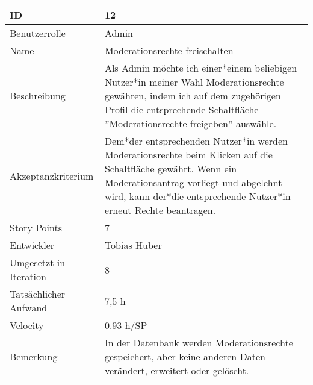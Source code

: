 \begin{tabularx}{\textwidth}{|p{}|X|}
	\hline
	ID & 12\\
	\hline
	Benutzerrolle & Admin\\
	\hline
	Name & Moderationsrechte freischalten\\
	\hline
	Beschreibung & Als Admin möchte ich einer*einem beliebigen Nutzer*in meiner Wahl Moderationsrechte gewähren, indem ich auf dem zugehörigen Profil die entsprechende Schaltfläche ''Moderationsrechte freigeben'' auswähle.\\
	\hline
	Akzeptanzkriterium & Dem*der entsprechenden Nutzer*in werden Moderationsrechte beim Klicken auf die Schaltfläche gewährt. Wenn ein Moderationsantrag vorliegt und abgelehnt wird, kann der*die entsprechende Nutzer*in erneut Rechte beantragen.\\
	\hline
	Story Points & 7\\
	\hline
	Entwickler & Tobias Huber\\
	\hline
	Umgesetzt in Iteration & 8\\
	\hline
	Tatsächlicher Aufwand & 7,5 h\\
	\hline
	Velocity & 0.93 h/SP\\
	\hline
	Bemerkung & In der Datenbank werden Moderationsrechte gespeichert, aber keine anderen Daten verändert, erweitert oder gelöscht.\\
	\hline
\end{tabularx}
\vspace{20pt}
